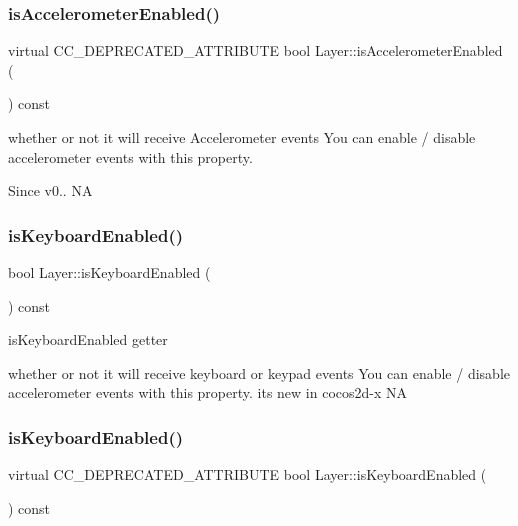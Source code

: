 \subsubsection{\texorpdfstring{is\+Accelerometer\+Enabled()}{isAccelerometerEnabled()}\hspace{0.1cm}{\footnotesize\ttfamily [2/2]}}
{\footnotesize\ttfamily virtual C\+C\+\_\+\+D\+E\+P\+R\+E\+C\+A\+T\+E\+D\+\_\+\+A\+T\+T\+R\+I\+B\+U\+TE bool Layer\+::is\+Accelerometer\+Enabled (\begin{DoxyParamCaption}{ }\end{DoxyParamCaption}) const\hspace{0.3cm}{\ttfamily [virtual]}}

whether or not it will receive Accelerometer events You can enable / disable accelerometer events with this property. \begin{DoxySince}{Since}
v0..  NA 
\end{DoxySince}
\mbox{\label{classLayer_a038e7b38bbd680609a6c05604971bebb}} 
\subsubsection{\texorpdfstring{is\+Keyboard\+Enabled()}{isKeyboardEnabled()}\hspace{0.1cm}{\footnotesize\ttfamily [1/2]}}
{\footnotesize\ttfamily bool Layer\+::is\+Keyboard\+Enabled (\begin{DoxyParamCaption}{ }\end{DoxyParamCaption}) const\hspace{0.3cm}{\ttfamily [virtual]}}



is\+Keyboard\+Enabled getter 

whether or not it will receive keyboard or keypad events You can enable / disable accelerometer events with this property. it\textquotesingle{}s new in cocos2d-\/x  NA \mbox{\label{classLayer_a762e193aa1b2515510a16ff621a81662}} 
\subsubsection{\texorpdfstring{is\+Keyboard\+Enabled()}{isKeyboardEnabled()}\hspace{0.1cm}{\footnotesize\ttfamily [2/2]}}
{\footnotesize\ttfamily virtual C\+C\+\_\+\+D\+E\+P\+R\+E\+C\+A\+T\+E\+D\+\_\+\+A\+T\+T\+R\+I\+B\+U\+TE bool Layer\+::is\+Keyboard\+Enabled (\begin{DoxyParamCaption}{ }\end{DoxyParamCaption}) const\hspace{0.3cm}{\ttfamily [virtual]}}

